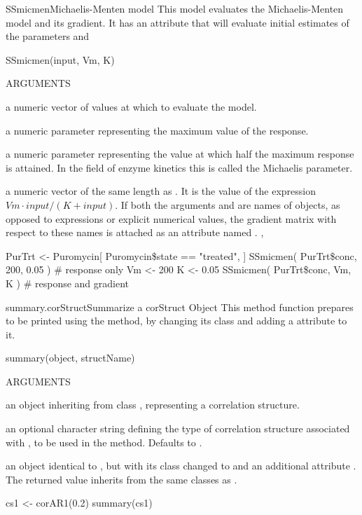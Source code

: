 \documentclass[pdftex]{article} \usepackage{url,graphicx}
\begin{document}
\begin{Helpfile}{SSmicmen}{Michaelis-Menten model}
This  model evaluates the Michaelis-Menten model and
its gradient.  It has an  attribute that
will evaluate initial estimates of the parameters  and 
\begin{Example}
SSmicmen(input, Vm, K)
\end{Example}
\begin{Argument}{ARGUMENTS}
\item[\Co{input:}]
a numeric vector of values at which to evaluate the model.
\item[\Co{Vm:}]
a numeric parameter representing the maximum value of the response.
\item[\Co{K:}]
a numeric parameter representing the  value at
which half the maximum response is attained.  In the field of enzyme
kinetics this is called the Michaelis parameter.
\end{Argument}
a numeric vector of the same length as .  It is the value of
the expression $Vm \cdot input/(K+input)$.  If both
the arguments  and  are
names of objects, as opposed to expressions or explicit numerical
values, the gradient matrix with respect to these names is attached as
an attribute named .
, 
\need 15pt
\vspace{-16pt} 
\begin{Example}
PurTrt <- Puromycin[ Puromycin\$state == "treated", ]
SSmicmen( PurTrt\$conc, 200, 0.05 )  # response only
Vm <- 200
K <- 0.05
SSmicmen( PurTrt\$conc, Vm, K ) # response and gradient
\end{Example}
\end{Helpfile}
\begin{Helpfile}{summary.corStruct}{Summarize a corStruct Object}
This method function prepares  to be printed using the
 method, by changing its class and adding a
 attribute to it.
\begin{Example}
summary(object, structName)
\end{Example}
\begin{Argument}{ARGUMENTS}
\item[\Co{object:}]
an object inheriting from class ,
representing a correlation structure.
\item[\Co{structName:}]
an optional character string defining the type of
correlation structure associated with , to be used in
the  method. Defaults to
.
\end{Argument}
an object identical to , but with its class changed to
 and an additional attribute
. The returned value inherits from the same classes
as .
\need 15pt
\vspace{-16pt} 
\begin{Example}
cs1 <- corAR1(0.2)
summary(cs1)
\end{Example}
\end{Helpfile}
\end{document}
